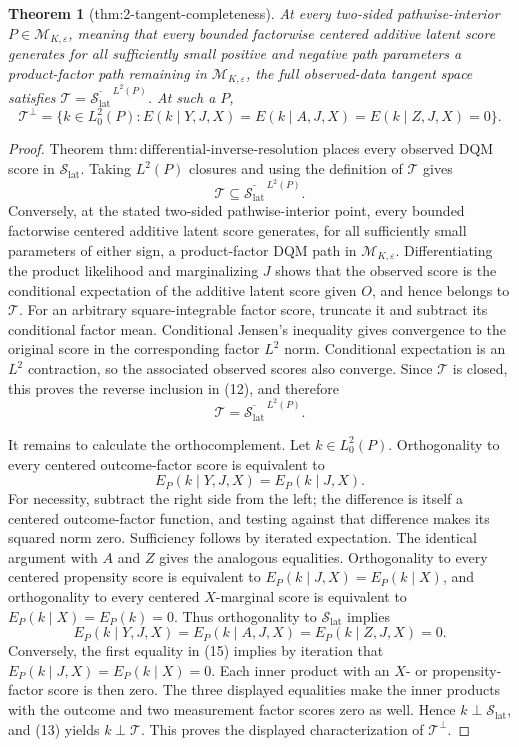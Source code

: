 \documentclass{article}
\newtheorem{theorem}{Theorem}
\begin{document}
\begin{theorem}[thm:2-tangent-completeness]\label{thm:2-tangent-completeness}
At every two-sided pathwise-interior \(P\in\mathcal M_{K,\varepsilon}\), meaning that every bounded factorwise centered additive latent score generates for all sufficiently small positive and negative path parameters a product-factor path remaining in \(\mathcal M_{K,\varepsilon}\), the full observed-data tangent space satisfies \(\mathcal T=\overline{\mathcal S_{\mathrm{lat}}}^{\,L^2(P)}\).  At such a \(P\),
\[
\mathcal T^{\perp}=\{k\in L^2_0(P):E(k\mid Y,J,X)=E(k\mid A,J,X)=E(k\mid Z,J,X)=0\}.
\]
\end{theorem}
\begin{proof}
Theorem \(\mathrm{thm{:}differential\mbox{-}inverse\mbox{-}resolution}\) places every observed DQM score in \(\mathcal S_{\mathrm{lat}}\).  Taking \(L^2(P)\) closures and using the definition of \(\mathcal T\) gives
\[
 \mathcal T\subseteq\overline{\mathcal S_{\mathrm{lat}}}^{\,L^2(P)}. \tag{12}
\]
Conversely, at the stated two-sided pathwise-interior point, every bounded factorwise centered additive latent score generates, for all sufficiently small parameters of either sign, a product-factor DQM path in \(\mathcal M_{K,\varepsilon}\).  Differentiating the product likelihood and marginalizing \(J\) shows that the observed score is the conditional expectation of the additive latent score given \(O\), and hence belongs to \(\mathcal T\).  For an arbitrary square-integrable factor score, truncate it and subtract its conditional factor mean.  Conditional Jensen's inequality gives convergence to the original score in the corresponding factor \(L^2\) norm.  Conditional expectation is an \(L^2\) contraction, so the associated observed scores also converge.  Since \(\mathcal T\) is closed, this proves the reverse inclusion in (12), and therefore
\[
 \mathcal T=\overline{\mathcal S_{\mathrm{lat}}}^{\,L^2(P)}. \tag{13}
\]

It remains to calculate the orthocomplement.  Let \(k\in L^2_0(P)\).  Orthogonality to every centered outcome-factor score is equivalent to
\[
 E_P(k\mid Y,J,X)=E_P(k\mid J,X). \tag{14}
\]
For necessity, subtract the right side from the left; the difference is itself a centered outcome-factor function, and testing against that difference makes its squared norm zero.  Sufficiency follows by iterated expectation.  The identical argument with \(A\) and \(Z\) gives the analogous equalities.  Orthogonality to every centered propensity score is equivalent to
\(E_P(k\mid J,X)=E_P(k\mid X)\), and orthogonality to every centered \(X\)-marginal score is equivalent to \(E_P(k\mid X)=E_P(k)=0\).  Thus orthogonality to \(\mathcal S_{\mathrm{lat}}\) implies
\[
 E_P(k\mid Y,J,X)=E_P(k\mid A,J,X)=E_P(k\mid Z,J,X)=0. \tag{15}
\]
Conversely, the first equality in (15) implies by iteration that \(E_P(k\mid J,X)=E_P(k\mid X)=0\).  Each inner product with an \(X\)- or propensity-factor score is then zero.  The three displayed equalities make the inner products with the outcome and two measurement factor scores zero as well.  Hence \(k\perp\mathcal S_{\mathrm{lat}}\), and (13) yields \(k\perp\mathcal T\).  This proves the displayed characterization of \(\mathcal T^\perp\).
\end{proof}
\end{document}
